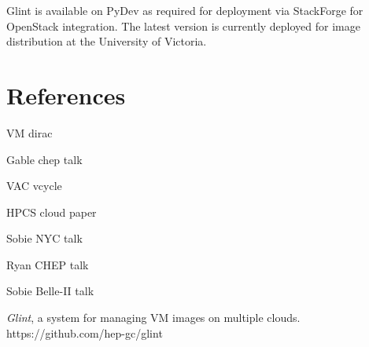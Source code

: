 \documentclass[a4paper]{jpconf}
\begin{document}
Glint is available on PyDev as required for deployment via StackForge for OpenStack integration. The latest version is currently deployed for image distribution at the University of Victoria. 


\section*{References}
\begin{thebibliography}{9}

VM dirac

Gable chep talk

VAC vcycle

HPCS cloud paper

Sobie NYC talk

Ryan CHEP talk

Sobie Belle-II talk


{\it Glint}, a system for managing VM images on multiple clouds.
https://github.com/hep-gc/glint

\end{thebibliography}
\end{document}

